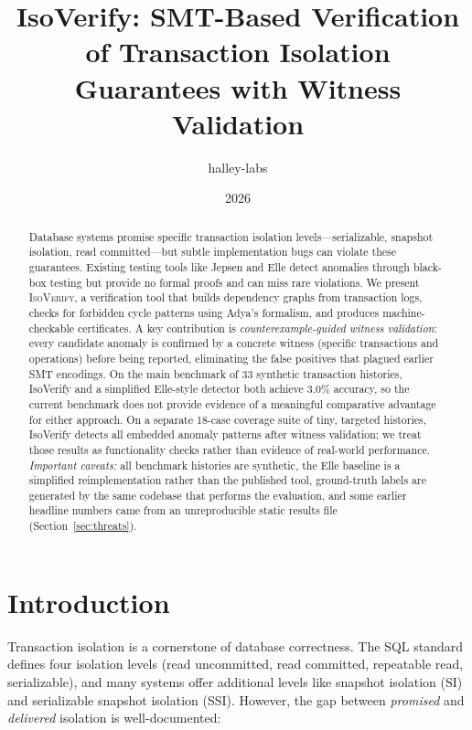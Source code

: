 \documentclass[11pt]{article}
\title{IsoVerify: SMT-Based Verification of Transaction Isolation\\Guarantees with Witness Validation}
\author{halley-labs}
\date{2026}
\begin{document}
\maketitle

\begin{abstract}
Database systems promise specific transaction isolation levels---serializable,
snapshot isolation, read committed---but subtle implementation bugs can violate
these guarantees.  Existing testing tools like Jepsen and Elle detect anomalies
through black-box testing but provide no formal proofs and can miss rare
violations.  We present \textsc{IsoVerify}, a verification tool that builds
dependency graphs from transaction logs, checks for forbidden cycle patterns
using Adya's formalism, and produces machine-checkable certificates.  A key
contribution is \emph{counterexample-guided witness validation}: every
candidate anomaly is confirmed by a concrete witness (specific transactions
and operations) before being reported, eliminating the false positives that
plagued earlier SMT encodings.  On the main benchmark of 33 synthetic
transaction histories, IsoVerify and a simplified Elle-style detector both
achieve 3.0\% accuracy, so the current benchmark does not provide evidence of a
meaningful comparative advantage for either approach.  On a separate 18-case
coverage suite of tiny, targeted histories, IsoVerify detects all embedded
anomaly patterns after witness validation; we treat those results as
functionality checks rather than evidence of real-world performance.
\emph{Important caveats:} all benchmark histories are synthetic, the Elle
baseline is a simplified reimplementation rather than the published tool,
ground-truth labels are generated by the same codebase that performs the
evaluation, and some earlier headline numbers came from an unreproducible
static results file (Section~\ref{sec:threats}).
\end{abstract}

\section{Introduction}
\label{sec:intro}

Transaction isolation is a cornerstone of database correctness. The SQL
standard defines four isolation levels (read uncommitted, read committed,
repeatable read, serializable), and many systems offer additional levels like
snapshot isolation (SI) and serializable snapshot isolation (SSI). However, the
gap between \emph{promised} and \emph{delivered} isolation is
well-documented:
\end{document}
